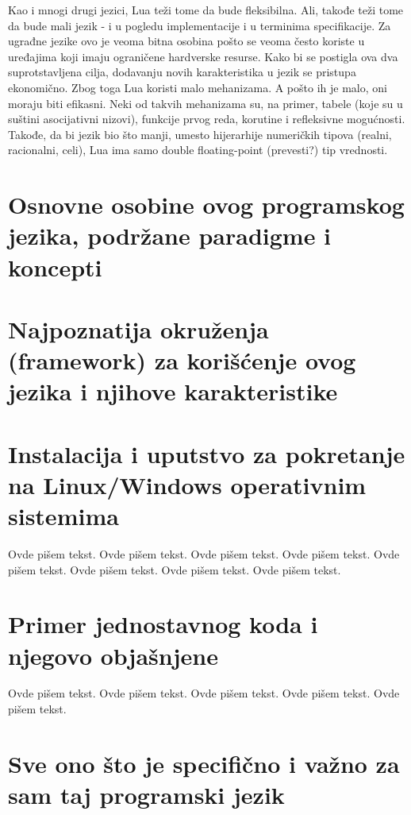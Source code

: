 \documentclass[a4paper]{article}
\begin{document}
Kao i mnogi drugi jezici, Lua teži tome da bude fleksibilna. Ali, takođe teži tome da bude mali jezik - i u pogledu implementacije i u terminima specifikacije. Za ugrađne jezike ovo je veoma bitna osobina pošto se veoma često koriste u uređajima koji imaju ograničene hardverske resurse. Kako bi se postigla ova dva suprotstavljena cilja, dodavanju novih karakteristika u jezik se pristupa ekonomično. Zbog toga Lua koristi malo mehanizama. A pošto ih je malo, oni moraju biti efikasni. Neki od takvih mehanizama su, na primer, tabele (koje su u suštini asocijativni nizovi), funkcije prvog reda, korutine i refleksivne mogućnosti. Takođe, da bi jezik bio što manji, umesto hijerarhije numeričkih tipova (realni, racionalni, celi), Lua ima samo double floating-point (prevesti?) tip vrednosti.\cite{multiParadigms}

\section{Osnovne osobine ovog programskog jezika, podržane paradigme i koncepti }
\label{sec:osobine_paradigme_koncepti}


\section{Najpoznatija okruženja (framework) za korišćenje ovog jezika i njihove karakteristike}
\label{sec:framework}


\section{Instalacija i uputstvo za pokretanje na Linux/Windows operativnim sistemima }
\label{sec:instalacija}


Ovde pišem tekst. 
Ovde pišem tekst. 
Ovde pišem tekst. 
Ovde pišem tekst. 
Ovde pišem tekst. 
Ovde pišem tekst. 
Ovde pišem tekst. 
Ovde pišem tekst. 



\section{Primer jednostavnog koda i njegovo objašnjene}
\label{sec:primer_koda}

Ovde pišem tekst. 
Ovde pišem tekst. 
Ovde pišem tekst. 
Ovde pišem tekst. 
Ovde pišem tekst. 

\section{Sve ono što je specifično i važno za sam taj programski jezik}
\label{sec:specificnosti}
\end{document}
